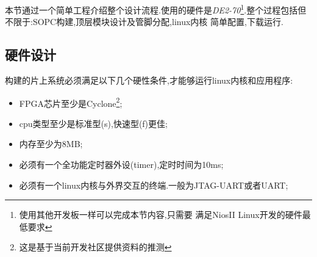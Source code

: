 \documentclass[12pt,a4paper,titlepage]{article}
\begin{document}
本节通过一个简单工程介绍整个设计流程.使用的硬件是\textit{DE2-70}\footnote{使用其他开发板一样可以完成本节内容,只需要
满足NiosII Linux开发的硬件最低要求}.整个过程包括但不限于:{SOPC构建,顶层模块设计及管脚分配,linux内核
简单配置,下载运行}.
\subsection{硬件设计}
构建的片上系统必须满足以下几个硬性条件,才能够运行linux内核和应用程序:
\begin{itemize}
\item FPGA芯片至少是Cyclone\footnote{这是基于当前开发社区提供资料的推测};
\item cpu类型至少是标准型(s),快速型(f)更佳;
\item 内存至少为8MB;
\item 必须有一个全功能定时器外设(timer),定时时间为10ms;
\item 必须有一个linux内核与外界交互的终端.一般为JTAG-UART或者UART;
\end{itemize}
\end{document}
